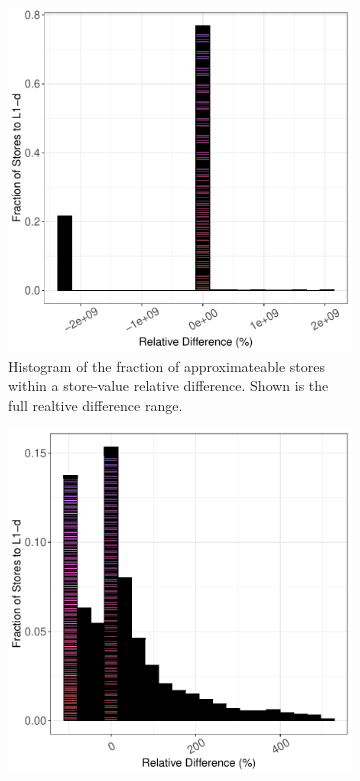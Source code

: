 \begin{figure}[htbp]
	\begin{subfigure}{0.33\textwidth}
		\centering
		\includegraphics[scale=0.4]{graphs/kmeans/full_hist.pdf}
		\caption{Histogram of the fraction of approximateable stores within a store-value relative difference. Shown is the full realtive difference range.}
	\end{subfigure}
	\begin{subfigure}{0.33\textwidth}
		\centering
		\includegraphics[scale=0.4]{graphs/kmeans/narrow_hist.pdf}

\end{subfigure}
\end{figure}
